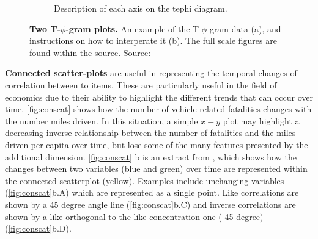 \begin{figure}[H]
\begin{subfigure}[b]{0.59\textwidth}
         \caption{Description of each axis on the tephi diagram. }
         \label{fig:tefidesc}
     \end{subfigure}
        \caption{\textbf{Two T-$\phi$-gram plots.} An example of the T-$\phi$-gram data (a),  and instructions on how to interperate it (b). The full scale figures are found within the source. Source: \citep{tephi}}
        \label{fig:tephi}
\end{figure}


\textbf{Connected scatter-plots} are useful in representing the temporal changes of correlation between to items. These are particularly useful in the field of economics due to their ability to highlight the different trends that can occur over time. \autoref{fig:conscat} shows how the number of vehicle-related fatalities changes with the number miles driven. In this situation, a simple $x-y$ plot may highlight a decreasing inverse relationship between the number of fatalities and the miles driven per capita over time, but lose some of the many features presented by the additional dimension.
\autoref{fig:conscat} b is an extract from \citep{defconscat}, which shows how the changes between two variables (blue and green) over time are represented within the connected scatterplot (yellow). Examples include unchanging variables (\autoref{fig:conscat}b.A) which are represented as a single point. Like correlations are shown by a 45 degree angle line (\autoref{fig:conscat}b.C) and inverse correlations are shown by a like orthogonal to the like concentration one (-45 degree)- (\autoref{fig:conscat}b.D).


